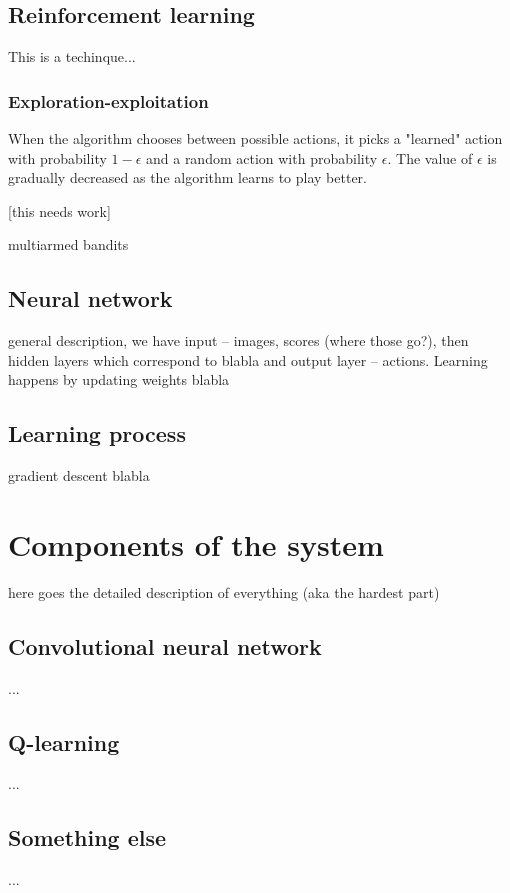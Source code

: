 \documentclass[a4paper,12pt]{article}
\begin{document}
\subsection{Reinforcement learning}
This is a techinque... 

\subsubsection{Exploration-exploitation}
When the algorithm chooses between possible actions, it picks a "learned" action with probability $1-\epsilon$ and a random action with probability $\epsilon$. The value of $\epsilon$ is gradually decreased as the algorithm learns to play better.

[this needs work]

multiarmed bandits

\subsection{Neural network}
general description, we have input -- images, scores (where those go?), then hidden layers which correspond to blabla and output layer -- actions. Learning happens by updating weights blabla

\subsection{Learning process}
gradient descent blabla



%
%
\pagebreak
\section{Components of the system}
here goes the detailed description of everything (aka the hardest part)

\subsection{Convolutional neural network}
...

\subsection{Q-learning}
...

\subsection{Something else}
...
\end{document}

